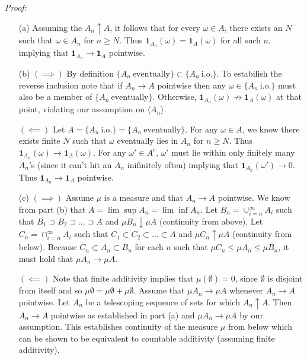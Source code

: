 \documentclass[10pt]{article}
\begin{document}
\textit{Proof:}
\begin{itemize}
  \item[(a)] Assuming the $A_n \uparrow A$, it follows that
  for every $\omega \in A$, there exists an $N$ such that
  $\omega \in A_n$ for $n \ge N$.
  Thus $\mathbf{1}_{A_n}(\omega) = \mathbf{1}_A(\omega)$
  for all such $n$, implying that 
  $\mathbf{1}_{A_n} \to \mathbf{1}_A$ pointwise.

  \item[(b)] $(\implies)$ 
  By definition $\{A_n \ \text{eventually}\} \subset \{A_n \ \text{i.o.}\}$.
  To estabilish the reverse inclusion note that if $A_n \to A$ pointwise 
  then any $\omega \in \{A_n \ \text{i.o.}\}$ must also be a member of 
  $\{A_n \ \text{eventually}\}$. Otherwise, $\mathbf{1}_{A_n}(\omega)
  \not \to \mathbf{1}_A(\omega)$ at that point, 
  violating our assumption on $\langle A_n \rangle$.
  
  $(\impliedby)$ 
  Let $A = \{A_n \ \text{i.o.}\} = \{A_n \ \text{eventually}\}$.
  For any $\omega \in A$, we know there exists finite $N$
  such that $\omega$ eventually lies in $A_n$ for $n \ge N$.
  Thus $\mathbf{1}_{A_n}(\omega) \to \mathbf{1}_{A}(\omega)$.
  For any $\omega' \in A^c$, $\omega'$ must lie within
  only finitely many $A_n$'s (since it can't hit an $A_n$ inifinitely often) 
  implying that $\mathbf{1}_{A_n}(\omega') \to 0$.
  Thus $\mathbf{1}_{A_n} \to \mathbf{1}_{A}$ pointwise.

  \item[(c)] $(\implies)$ Assume $\mu$ is a measure and that
  $A_n \to A$ pointwise. We know from part (b) that
  $A = \lim \sup A_n = \lim \inf A_n$. 
  Let $B_n = \cup_{i=n}^\infty A_i$ such that 
  $B_1 \supset B_2 \supset \dots \supset A$ and 
  $\mu B_n \downarrow \mu A$ (continuity from above).
  Let $C_n = \cap_{i=n}^\infty A_i$ such that 
  $C_1 \subset C_2 \subset \dots \subset A$ and 
  $\mu C_n \uparrow \mu A$ (continuity from below).
  Because $C_n \subset A_n \subset B_n$ for each $n$
  such that $\mu C_n \le \mu A_n \le \mu B_n$,
  it must hold that $\mu A_n \to \mu A$.
  

  $(\impliedby)$ Note that finite additivity implies that 
  $\mu(\emptyset)=0$, since $\emptyset$ is disjoint from itself
  and so $\mu \emptyset = \mu \emptyset + \mu \emptyset$.
  Assume that $\mu A_n \to \mu A$ whenever $A_n \to A$ pointwise.
  Let $A_n$ be a telescoping sequence of sets for which $A_n \uparrow A$.
  Then $A_n \to A$ pointwise as established in part (a) 
  and $\mu A_n \to \mu A$ by our assumption.
  This establishes continuity of the measure $\mu$ from below which 
  can be shown to be equivalent to countable additivity
  (assuming finite additivity). 
  
\end{itemize}
\end{document}
